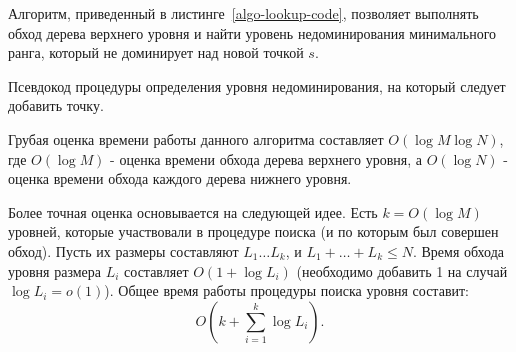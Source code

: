 Алгоритм, приведенный в листинге~\ref{algo-lookup-code}, позволяет выполнять обход дерева верхнего
уровня и найти уровень недоминирования минимального ранга, который не доминирует над новой точкой $s$.

\begin{algorithm}[H]
\begin{algorithmic}[1]
        \Else
        \EndIf
    \EndWhile
        \State{}
    \EndIf
    \State{}
\EndFunction
{}
            \EndIf
        \Else
        \EndIf
    \EndWhile
    \State{}
\EndFunction
\end{algorithmic}
\caption{Псевдокод процедуры определения уровня недоминирования, на который следует добавить точку.}
\label{algo-lookup-code}
\end{algorithm}

Грубая оценка времени работы данного алгоритма составляет $O(\log M \log N)$, где $O(\log M)$ -
оценка времени обхода дерева верхнего уровня, а $O(\log N)$ - оценка времени обхода каждого дерева
нижнего уровня.

Более точная оценка основывается на следующей идее. Есть $k = O(\log M)$ уровней, которые участвовали
в процедуре поиска (и по которым был совершен обход). Пусть их размеры составляют $L_1 \ldots L_k$,
и $L_1 + \ldots + L_k \le N$.
Время обхода уровня размера $L_i$ составляет $O(1 + \log L_i)$ (необходимо добавить 1 на случай
$\log L_i = o(1)$). Общее время работы процедуры поиска уровня составит:
$$O\left(k + \sum_{i=1}^{k}{\log L_i}\right).$$

